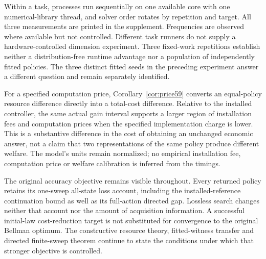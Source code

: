 Within a task, processes run sequentially on one available core with one numerical-library thread, and solver order rotates by repetition and target. All three measurements are printed in the supplement. Frequencies are observed where available but not controlled. Different task runners do not supply a hardware-controlled dimension experiment. Three fixed-work repetitions establish neither a distribution-free runtime advantage nor a population of independently fitted policies. The three distinct fitted seeds in the preceding experiment answer a different question and remain separately identified.

For a specified computation price, Corollary~\ref{cor:price59} converts an equal-policy resource difference directly into a total-cost difference. Relative to the installed controller, the same actual gain interval supports a larger region of installation fees and computation prices when the specified implementation charge is lower. This is a substantive difference in the cost of obtaining an unchanged economic answer, not a claim that two representations of the same policy produce different welfare. The model's units remain normalized; no empirical installation fee, computation price or welfare calibration is inferred from the timings.

The original accuracy objective remains visible throughout. Every returned policy retains its one-sweep all-state loss account, including the installed-reference continuation bound as well as its full-action directed gap. Lossless search changes neither that account nor the amount of acquisition information. A successful initial-law cost-reduction target is not substituted for convergence to the original Bellman optimum. The constructive resource theory, fitted-witness transfer and directed finite-sweep theorem continue to state the conditions under which that stronger objective is controlled.
